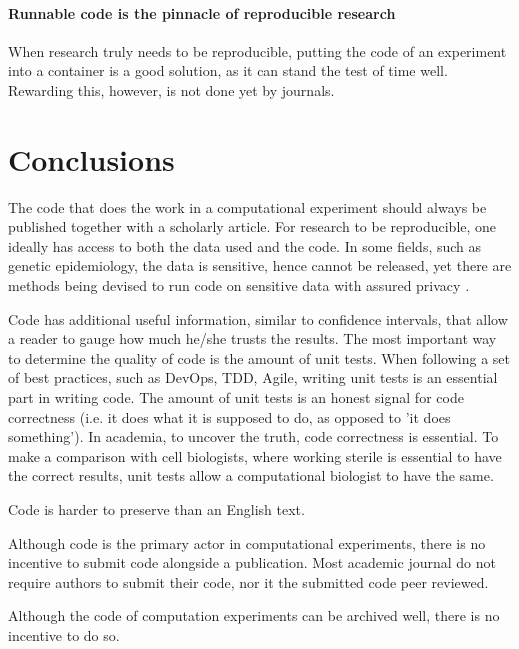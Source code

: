 \paragraph{Runnable code is the pinnacle of reproducible research}

When research truly needs to be reproducible, putting the code 
of an experiment into a container is a good solution, as it 
can stand the test of time well. Rewarding this, however, is not
done yet by journals.

\section{Conclusions}

The code that does the work in a computational experiment should
always be published together with a scholarly article.
For research to be reproducible, one ideally has access to
both the data used and the code.
In some fields, such as genetic epidemiology, the data is
sensitive, hence cannot be released,
yet there are methods being devised to run code on sensitive
data with assured privacy \cite{zhang2016review,azencott2018machine}.

Code has additional useful information, similar to confidence intervals,
that allow a reader to gauge how much he/she trusts the results.
The most important way to determine the quality of code
is the amount of unit tests.
When following a set of best practices, such as DevOps, TDD, Agile,
writing unit tests is an essential 
part in writing code.
The amount of unit tests is an honest signal 
for code correctness (i.e. it does what it is supposed to do, as opposed
to 'it does something').
In academia, to uncover the truth, code correctness is essential.
To make a comparison with cell biologists, where working
sterile is essential to have the correct results,
unit tests allow a computational biologist to have the same.

Code is harder to preserve than an English text.

Although code is the primary actor in computational experiments,
there is no incentive to submit code alongside a publication.
Most academic journal do not require authors to submit their code,
nor it the submitted code peer reviewed.

Although the code of computation experiments can be archived well, 
there is no incentive to do so.

